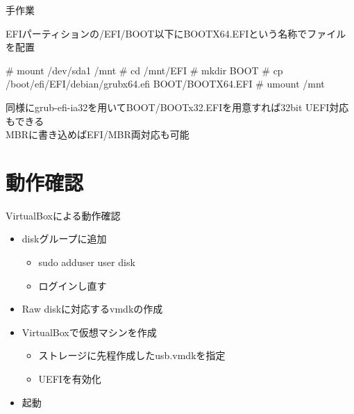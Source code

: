 \begin{frame}[containsverbatim]{手作業}

EFIパーティションの/EFI/BOOT以下にBOOTX64.EFIという名称でファイルを配置
\begin{commandline}
# mount /dev/sda1 /mnt
# cd /mnt/EFI
# mkdir BOOT
# cp /boot/efi/EFI/debian/grubx64.efi BOOT/BOOTX64.EFI
# umount /mnt
\end{commandline}
同様にgrub-efi-ia32を用いてBOOT/BOOTx32.EFIを用意すれば32bit UEFI対応もできる
\\
MBRに書き込めばEFI/MBR両対応も可能
\end{frame}

\section{動作確認}

\begin{frame}[containsverbatim]{VirtualBoxによる動作確認}
  \begin{itemize}
  \item diskグループに追加
    \begin{itemize}
    \item sudo adduser user disk
    \item ログインし直す
    \end{itemize}
  \item Raw diskに対応するvmdkの作成
  \item VirtualBoxで仮想マシンを作成
    \begin{itemize}
    \item ストレージに先程作成したusb.vmdkを指定
    \item UEFIを有効化
    \end{itemize}
  \item 起動
  \end{itemize}
\end{frame}

